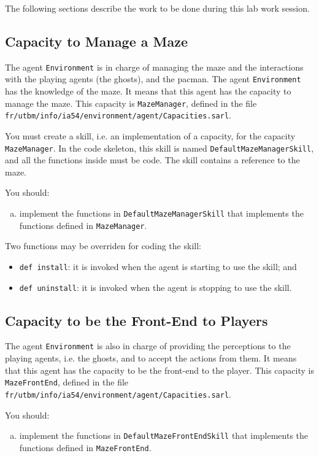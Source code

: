 \documentclass[article,english,nodocumentinfo]{multiagentfrreport}
\begin{document}
The following sections describe the work to be done during this lab work session.

\subsection{Capacity to Manage a Maze}

The agent \texttt{Environment} is in charge of managing the maze and the interactions with the playing agents (the ghosts), and the pacman.
The agent \texttt{Environment} has the knowledge of the maze. 
It means that this agent has the capacity to manage the maze.
This capacity is \texttt{MazeManager}, defined in the file \texttt{fr/utbm/info/ia54/environment/agent/Capacities.sarl}.


You must create a skill, i.e. an implementation of a capacity, for the capacity \texttt{MazeManager}.
In the code skeleton, this skill is named \texttt{DefaultMazeManagerSkill}, and all the functions inside must be code.
The skill contains a reference to the maze.

You should:
\begin{enumerate}[a)]
\item implement the functions in \texttt{DefaultMazeManagerSkill} that implements the functions defined in \texttt{MazeManager}.
\end{enumerate}

Two functions may be overriden for coding the skill:
\begin{itemize}
\item \texttt{def install}: it is invoked when the agent is starting to use the skill; and
\item \texttt{def uninstall}: it is invoked when the agent is stopping to use the skill.
\end{itemize}

\subsection{Capacity to be the Front-End to Players}

The agent \texttt{Environment} is also in charge of providing the perceptions to the playing agents, i.e. the ghosts, and to accept the actions from them.
It means that this agent has the capacity to be the front-end to the player.
This capacity is \texttt{MazeFrontEnd}, defined in the file \texttt{fr/utbm/info/ia54/environment/agent/Capacities.sarl}.

You should:
\begin{enumerate}[a)]
\item implement the functions in \texttt{DefaultMazeFrontEndSkill} that implements the functions defined in \texttt{MazeFrontEnd}.
\end{enumerate}
\end{document}

